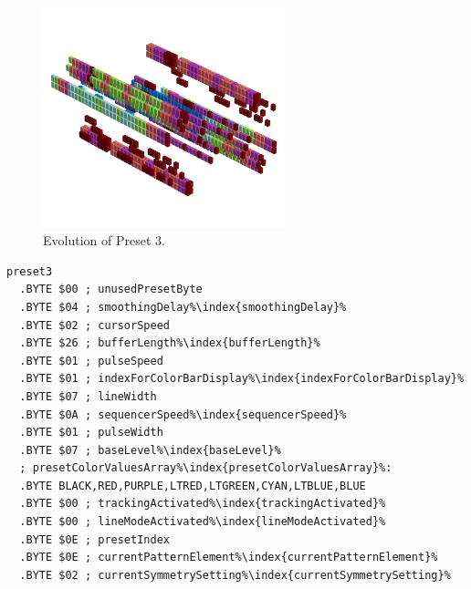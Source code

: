 \clearpage
\begin{minipage}[b]{0.48\linewidth}

\begin{figure}[H]                                                          
  \centering                                                             
  \begin{adjustbox}{width=7cm,center}                                   
  \includegraphics[width=7cm]{src/presets/pattern3-45.png}%
  \end{adjustbox}                                                        
\caption{Evolution of Preset 3.}                                           
\end{figure}                                                               
\end{minipage}
\hspace{0.1cm}
\begin{minipage}[b]{0.48\linewidth}                            
                                                                           
\begin{lstlisting}[basicstyle=\ttfamily\scriptsize,caption=Data structure for Preset 3.,escapechar=\%]
preset3
  .BYTE $00 ; unusedPresetByte
  .BYTE $04 ; smoothingDelay%\index{smoothingDelay}%
  .BYTE $02 ; cursorSpeed
  .BYTE $26 ; bufferLength%\index{bufferLength}%
  .BYTE $01 ; pulseSpeed
  .BYTE $01 ; indexForColorBarDisplay%\index{indexForColorBarDisplay}%
  .BYTE $07 ; lineWidth
  .BYTE $0A ; sequencerSpeed%\index{sequencerSpeed}%
  .BYTE $01 ; pulseWidth
  .BYTE $07 ; baseLevel%\index{baseLevel}%
  ; presetColorValuesArray%\index{presetColorValuesArray}%: 
  .BYTE BLACK,RED,PURPLE,LTRED,LTGREEN,CYAN,LTBLUE,BLUE
  .BYTE $00 ; trackingActivated%\index{trackingActivated}%
  .BYTE $00 ; lineModeActivated%\index{lineModeActivated}%
  .BYTE $0E ; presetIndex
  .BYTE $0E ; currentPatternElement%\index{currentPatternElement}%
  .BYTE $02 ; currentSymmetrySetting%\index{currentSymmetrySetting}%
\end{lstlisting}

\end{minipage}
